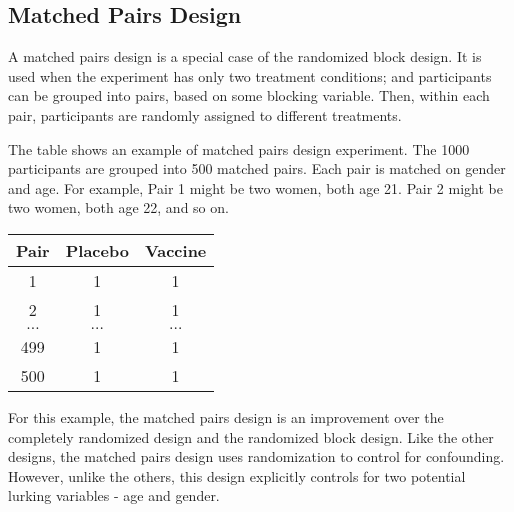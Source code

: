 \documentclass[12pt]{article}
\begin{document}
\newpage
\subsection*{Matched Pairs Design}

A matched pairs design is a special case of the randomized block design. It is used when the experiment has only two treatment conditions; and participants can be grouped into pairs, based on some blocking variable. Then, within each pair, participants are randomly assigned to different treatments.

The table shows an example of matched pairs design experiment. The 1000 participants are grouped into 500 matched pairs. Each pair is matched on gender and age. For example, Pair 1 might be two women, both age 21. Pair 2 might be two women, both age 22, and so on.

\begin{center}
\begin{tabular}{|c||c|c|}
\hline   
Pair	& Placebo &	Vaccine \\ \hline \hline
1	&1	&1 \\ \hline
2	&1	&1 \\ \hline
$\ldots$	& $\ldots$	& $\ldots$ \\ \hline
499	&1	&1 \\ \hline
500	&1	&1 \\ \hline
\end{tabular} 
\end{center}
For this example, the matched pairs design is an improvement over the completely randomized design and the randomized block design. Like the other designs, the matched pairs design uses randomization to control for confounding. However, unlike the others, this design explicitly controls for two potential lurking variables - age and gender.
\end{document}
